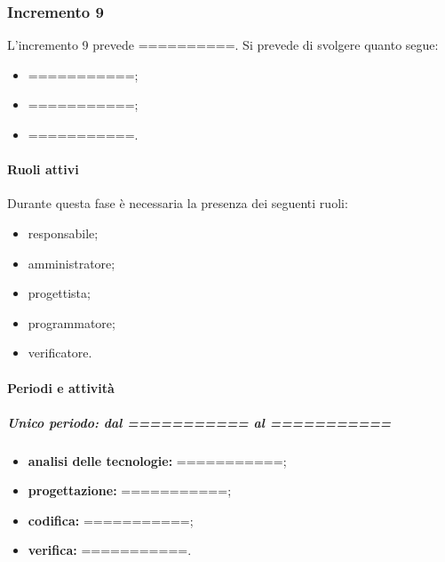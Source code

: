 
\subsubsection{Incremento 9}
L'incremento 9 prevede ==========. Si prevede di svolgere quanto segue:
\begin{itemize}
	\item ===========;
	\item ===========;
	\item ===========.
\end{itemize}

\paragraph{Ruoli attivi}
Durante questa fase è necessaria la presenza dei seguenti ruoli: 
\begin{itemize} 
	\item responsabile; 
	\item amministratore; 
	\item progettista; 
	\item programmatore; 
	\item verificatore.
\end{itemize}

\paragraph{Periodi e attività}
\subparagraph{Unico periodo: dal =========== al ===========}
\begin{itemize}
	\item \textbf{analisi delle tecnologie:} ===========;
	\item \textbf{progettazione:} ===========;
	\item \textbf{codifica:} ===========;
	\item \textbf{verifica:} ===========.
\end{itemize}

\newpage 


\newpage %

